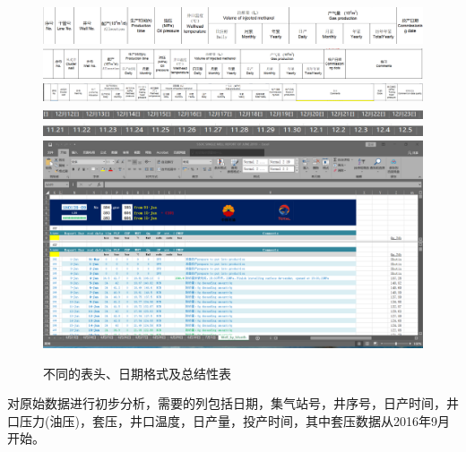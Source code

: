 \begin{figure}
    \centering
    \includegraphics[scale=0.3,angle=0]{figure/表头1.png}
    \hfil
    \includegraphics[scale=0.3,angle=0]{figure/表头2.png}
    \hfil
    \includegraphics[scale=0.25,angle=0]{figure/表头3.png}
    \hfil
    \includegraphics[scale=0.3,angle=0]{figure/日期格式1.png}
    \hfil
    \includegraphics[scale=0.3,angle=0]{figure/日期格式2.png}
    \hfil
    \includegraphics[scale=0.3,angle=0]{figure/总结性表.png}
    \caption{不同的表头、日期格式及总结性表}
    \label{fig:difTable}
\end{figure}

对原始数据进行初步分析，需要的列包括日期，集气站号，井序号，日产时间，井口压力(油压)，套压，井口温度，日产量，投产时间，其中套压数据从2016年9月开始。


